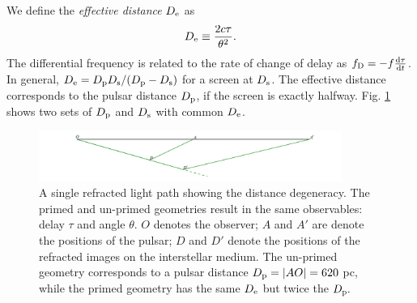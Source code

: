 \documentclass[useAMS,usenatbib]{mn2e}
\begin{document}
We define the {\it effective distance} $D_{\rm e}$ as
\begin{equation}
D_{\rm e} \equiv \frac{2c\tau}{\theta^2}.
\end{equation}
The differential frequency is related to the rate of change of delay
as $f_{\rm D}  =-f\frac{\rm d\tau}{\operatorname{d \!} t}$.    
In general, $D_{\rm e}={D_{\rm p} D_{\rm s}}/({D_{\rm p} - D_{\rm
    s}})$ for a screen at $D_{\rm s}$.  
    The effective distance
corresponds to the pulsar distance $D_{\rm p}$, if the screen is exactly halfway.  
Fig. \ref{fig:Singledegeneracy} shows two sets of $D_{\rm p}$ and $D_{\rm s}$ with common $D_{\rm e}$.

\begin{figure}
\centering
\hspace*{-0.4in}\includegraphics[width=3.9in]{single_degeneracy.pdf}
\caption{A single refracted light path showing the distance
  degeneracy.  The primed and un-primed geometries result in the same
  observables: delay $\tau$ and angle $\theta$.
$O$ denotes the observer; $A$ and $A'$ are denote the positions of the
pulsar; $D$ and $D'$ denote the positions of the refracted images on the
interstellar medium. The un-primed geometry corresponds to a pulsar
distance $D_{\rm p} = |AO| = 620$ pc, while the primed geometry has the same $D_{\rm e}$ but twice the
$D_{\rm p}.$}
\label{fig:Singledegeneracy}
\end{figure}


\end{document}
